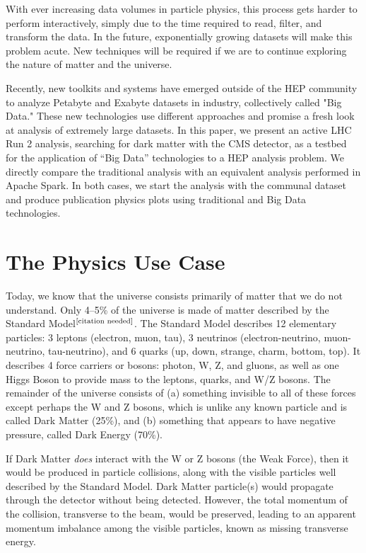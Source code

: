 \documentclass[a4paper]{jpconf}
\begin{document}
With ever increasing data volumes in particle physics, this process gets harder to perform interactively, simply due to the time required to read, filter, and transform the data. In the future, exponentially growing datasets will make this problem acute. New techniques will be required if we are to continue exploring the nature of matter and the universe.

Recently, new toolkits and systems have emerged outside of the HEP community to analyze Petabyte and Exabyte datasets in industry, collectively called "Big Data." These new technologies use different approaches and promise a fresh look at analysis of extremely large datasets. In this paper, we present an active LHC Run 2 analysis, searching for dark matter with the CMS detector, as a testbed for the application of “Big Data” technologies to a HEP analysis problem. We directly compare the traditional analysis with an equivalent analysis performed in Apache Spark. In both cases, we start the analysis with the communal dataset and produce publication physics plots using traditional and Big Data technologies. 

\section{The Physics Use Case}

Today, we know that the universe consists primarily of matter that we do not understand. Only 4--5\% of the universe is made of matter described by the Standard Model$^{\lbrack\mbox{\scriptsize citation needed}\rbrack}$. The Standard Model describes 12 elementary particles: 3 leptons (electron, muon, tau), 3 neutrinos (electron-neutrino, muon-neutrino, tau-neutrino), and 6 quarks (up, down, strange, charm, bottom, top). It describes 4 force carriers or bosons: photon, W, Z, and gluons, as well as one Higgs Boson to provide mass to the leptons, quarks, and W/Z bosons. The remainder of the universe consists of (a) something invisible to all of these forces except perhaps the W and Z bosons, which is unlike any known particle and is called Dark Matter (25\%), and (b) something that appears to have negative pressure, called Dark Energy (70\%).

If Dark Matter {\it does} interact with the W or Z bosons (the Weak Force), then it would be produced in particle collisions, along with the visible particles well described by the Standard Model. Dark Matter particle(s) would propagate through the detector without being detected. However, the total momentum of the collision, transverse to the beam, would be preserved, leading to an apparent momentum imbalance among the visible particles, known as missing transverse energy.
\end{document}
